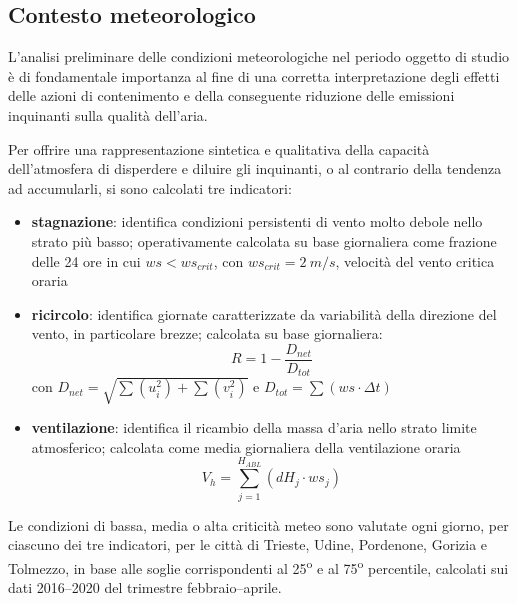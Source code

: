 
\subsection{Contesto meteorologico}\label{cap:meteo}
L’analisi preliminare delle condizioni meteorologiche nel periodo oggetto di studio è di fondamentale importanza al fine di una corretta interpretazione degli effetti delle azioni di contenimento e della conseguente riduzione delle emissioni inquinanti sulla qualità dell'aria.

Per offrire una rappresentazione sintetica e qualitativa della capacità dell'atmosfera di disperdere e diluire gli inquinanti, o al contrario della tendenza ad accumularli, si sono calcolati tre indicatori:
    \begin{itemize}
        \item \textbf{stagnazione}: identifica condizioni persistenti di vento molto debole nello strato più basso; operativamente calcolata su base giornaliera come frazione delle 24 ore in cui $ws<ws_{crit}$, con $ws_{crit}=2~m/s$, velocità del vento critica oraria\citep{allwine1994single}
        \item \textbf{ricircolo}: identifica giornate caratterizzate da variabilità della direzione del vento, in particolare brezze; calcolata su base giornaliera: $$R=1-\frac{D_{net}}{D_{tot}}$$ con $D_{net}=\sqrt{\sum(u_i^2)+\sum(v_i^2)}$ e $D_{tot}=\sum(ws\cdot\Delta t)$ \citep{allwine1994single,perez2014atmospheric}
        \item \textbf{ventilazione}: identifica il ricambio della massa d'aria nello strato limite atmosferico; calcolata come media giornaliera della ventilazione oraria \citep{pasch2011meteorological,wu2013observational}
        $$V_h=\sum_{j=1}^{H_{ABL}}(dH_j \cdot ws_j)$$
    \end{itemize}

Le condizioni di bassa, media o alta criticità meteo sono valutate ogni giorno, per ciascuno dei tre indicatori, per le città di Trieste, Udine, Pordenone, Gorizia e Tolmezzo, in base alle soglie corrispondenti al 25\textsuperscript{o} e al 75\textsuperscript{o} percentile, calcolati sui dati 2016--2020 del trimestre febbraio--aprile.  

